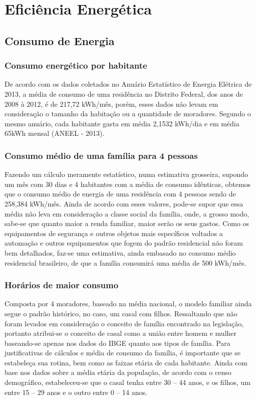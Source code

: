 \chapter{Eficiência Energética}
\section{Consumo de Energia}

\subsection{Consumo energético por habitante}

	De acordo com os dados coletados no Anuário Estatístico de Energia Elétrica de 2013, a média de consumo de uma residência no Distrito Federal, dos anos de 2008 à 2012, é de 217,72 kWh/mês, porém, esses dados não levam em consideração o tamanho da habitação ou a quantidade de moradores. Segundo o mesmo anuário, cada habitante gasta em média 2,1532 kWh/dia e em média 65kWh mensal (ANEEL - 2013).

\subsection{Consumo médio de uma família para 4 pessoas}

	Fazendo um cálculo meramente estatístico, numa estimativa grosseira, supondo um mês com 30 dias e 4 habitantes com a média de consumo idênticas, obtemos que o consumo médio de energia de uma residência com 4 pessoas sendo de 258,384 kWh/mês. Ainda de acordo com esses valores, pode-se supor que essa média não leva em consideração a classe social da família, onde, a grosso modo, sabe-se que quanto maior a renda familiar, maior serão os seus gastos. Como os equipamentos de segurança e outros objetos mais específicos voltados a automação e outros equipamentos que fogem do padrão residencial não foram bem detalhados, faz-se uma estimativa, ainda embasado no consumo médio residencial brasileiro, de que a família consumirá uma média de 500 kWh/mês.

\subsection{Horários de maior consumo}

	Composta por 4 moradores, baseado na média nacional, o modelo familiar ainda segue o padrão histórico, no caso, um casal com filhos. Ressaltando que não foram levados em consideração o conceito de família encontrado na legislação, portanto atribui-se o conceito de casal como a união entre homem e mulher baseando-se apenas nos dados do IBGE quanto aos tipos de família. Para justificativas de cálculos e média de consumo da família, é importante que se estabeleça sua rotina, bem como as faixas etária de cada habitante. Ainda com base nos dados sobre a média etária da população, de acordo com o censo demográfico, estabeleceu-se que o casal tenha entre 30 – 44 anos, e os filhos, um entre 15 – 29 anos e o outro entre 0 – 14 anos.

